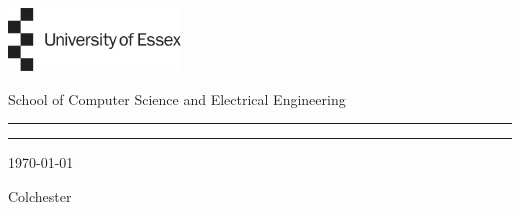 \documentclass[11pt, a4paper,twoside]{report}
\theoremstyle{plain} %
\theoremstyle{definition} %
\numberwithin{equation}{chapter}
\begin{document}


\thispagestyle{empty} %

\noindent
\begin{multicols}{2}

    \begin{minipage}{0.1\textwidth}
        \includegraphics[height=4.5em]{essex.png}
    \end{minipage}

    \hfill

    \begin{minipage}{0.5\textwidth}
        \begin{center}
            \renewcommand\familydefault{\sfdefault}
            \selectfont
            {\large School of Computer Science and Electrical Engineering}
        \end{center}
    \end{minipage}
\end{multicols}

\begin{center}
    \noindent\textcolor{myred}{\rule{\linewidth}{4.8pt}}

    \vspace{2em}

    \vspace{3em}

    \vspace{3em}

    \vfill

    \vspace{0.5em}
    \noindent\textcolor{myred}{\rule{\linewidth}{4.8pt}}

    \vspace{2em}
    {\Large \today }

    {\Large Colchester}
\end{center}

\clearpage
\end{document}
